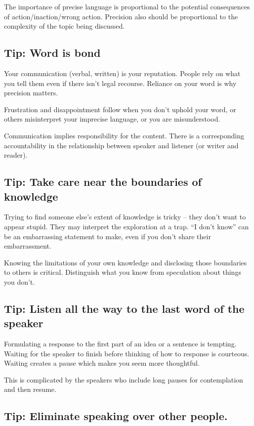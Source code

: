 The importance of precise language is proportional to the potential consequences of action/inaction/wrong action.
Precision also should be proportional to the complexity of the topic being discussed. 

\subsection*{Tip: Word is bond\label{sec:word-is-bond}}

Your communication (verbal, written) is your reputation. People rely on what you tell them even if there isn't legal recourse. Reliance on your word is why precision matters. 

Frustration and disappointment follow when you don't uphold your word, or others misinterpret your imprecise language, or you are misunderstood.

Communication implies responsibility for the content.  There is a corresponding accountability in the relationship between speaker and listener (or writer and reader).

\subsection*{Tip: Take care near the boundaries of knowledge}

Trying to find someone else's extent of knowledge is tricky -- they don't want to appear stupid. They may interpret the exploration at a trap. ``I don't know'' can be an embarrassing statement to make, even if you don't share their embarrassment. 

Knowing the limitations of your own knowledge and disclosing those boundaries to others is critical. Distinguish what you know from speculation about things you don't. 

\subsection*{Tip: Listen all the way to the last word of the speaker}

Formulating a response to the first part of an idea or a sentence is tempting. Waiting for the speaker to finish before thinking of how to response is courteous. Waiting creates a pause which makes you seem more thoughtful. 

This is complicated by the speakers who include long pauses for contemplation and then resume. 

\subsection*{Tip: Eliminate speaking over other people.\label{sec:crosstalk}}

